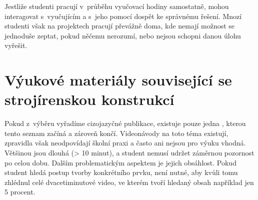     Jestliže studenti pracují v~průběhu vyučovací hodiny samostatně, mohou interagovat s~vyučujícím a s~jeho pomocí dospět ke správnému řešení.
    Mnozí studenti však na projektech pracují převážně doma, kde nemají možnost se jednoduše zeptat, pokud něčemu nerozumí, nebo nejsou schopni danou úlohu vyřešit.

\section{Výukové materiály související se strojírenskou konstrukcí}
    Pokud z~výběru vyřadíme cizojazyčné publikace, existuje pouze jedna , kterou tento seznam začíná a zároveň končí. 
    Videonávody na toto téma existují, zpravidla však neodpovídají školní praxi a často ani nejsou pro výuku vhodná.
    Většinou jsou dlouhá (> 10 minut), a student nemusí udržet záměrnou pozornost po celou dobu.
    Dalším problematickým aspektem je jejich obsáhlost.
    Pokud student hledá postup tvorby konkrétního prvku, není nutné, aby kvůli tomu zhlédnul celé dvacetiminutové video, ve kterém tvoří hledaný obsah například jen 5 procent. 
